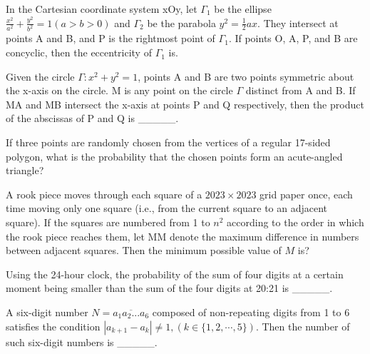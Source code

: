 \begin{problem}\label{AIChallenge_Geo26}
In the Cartesian coordinate system xOy, let \(\Gamma_{1}\) be the ellipse \(\frac{x^{2}}{a^{2}}+\frac{y^{2}}{b^{2}}=1(a>b>0)\) and \(\Gamma_{2}\) be the parabola \(y^{2}=\frac{1}{2}ax\). They intersect at points A and B, and P is the rightmost point of \(\Gamma_{1}\). If points O, A, P, and B are concyclic, then the eccentricity of \(\Gamma_{1}\) is.
\end{problem}



\begin{problem}\label{AIChallenge_Geo27}
Given the circle $\Gamma: x^{2}+y^{2}=1$, points A and B are two points symmetric about the x-axis on the circle. M is any point on the circle $\Gamma$ distinct from A and B. If MA and MB intersect the x-axis at points P and Q respectively, then the product of the abscissas of P and Q is \_\_\_\_\_. 
\end{problem}



\begin{problem}\label{Combinary-1}
If three points are randomly chosen from the vertices of a regular 17-sided polygon, what is the probability that the chosen points form an acute-angled triangle?
\end{problem}

\begin{problem}\label{Combinary-2}
A rook piece moves through  each square of a $2023\times 2023 $ grid paper once, each time moving only one square (i.e., from the current square to an adjacent square). If the squares are numbered from 1 to $n^2$ according to the order in which the rook piece reaches them, let MM denote the maximum difference in numbers between adjacent squares. Then the minimum possible value of $M$ is?
\end{problem}

\begin{problem}\label{Combinary-3}
 Using the 24-hour clock, the probability of the sum of four digits at a certain moment being smaller than the sum of the four digits at 20:21 is \_\_\_\_\_.
\end{problem}



\begin{problem}\label{Combinary-4}
 A six-digit number $N=\overline{a_1a_2...a_{6}}$ composed of non-repeating digits from 1 to 6 satisfies the condition $|a_{k+1}-a_{k}| \neq 1, (k\in \{1,2, \cdots, 5\})$. Then the number of such six-digit numbers is \_\_\_\_\_.
\end{problem}


